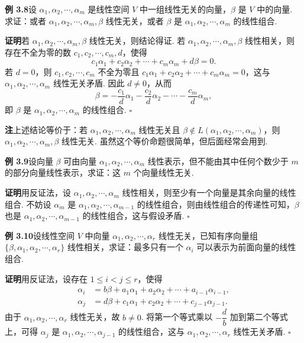 \documentclass[UTF8, 12pt, fontset=fandol, oneside]{ctexart}
\begin{document}
\noindent\textbf{例 3.8}\quad 设 $\alpha_1,\alpha_2,\cdots,\alpha_m$ 是线性空间 $V$ 中一组线性无关的向量，$\beta$ 是 $V$ 中的向量. 求证：或者 $\alpha_1,\alpha_2,\cdots,\alpha_m,\beta$ 线性无关，或者 $\beta$ 是 $\alpha_1,\alpha_2,\cdots,\alpha_m$ 的线性组合.

\noindent\textbf{证明}\quad 若 $\alpha_1,\alpha_2,\cdots,\alpha_m,\beta$ 线性无关，则结论得证. 若 $\alpha_1,\alpha_2,\cdots,\alpha_m,\beta$ 线性相关，则存在不全为零的数 $c_1,c_2,\cdots,c_m,d$，使得
\[
c_1\alpha_1+c_2\alpha_2+\cdots+c_m\alpha_m+d\beta=0.
\]
若 $d=0$，则 $c_1,c_2,\cdots,c_m$ 不全为零且 $c_1\alpha_1+c_2\alpha_2+\cdots+c_m\alpha_m=0$，这与 $\alpha_1,\alpha_2,\cdots,\alpha_m$ 线性无关矛盾. 因此 $d\ne 0$，从而
\[
\beta=-\frac{c_1}{d}\alpha_1-\frac{c_2}{d}\alpha_2-\cdots-\frac{c_m}{d}\alpha_m,
\]
即 $\beta$ 是 $\alpha_1,\alpha_2,\cdots,\alpha_m$ 的线性组合. $\square$

\noindent\textbf{注}\quad 上述结论等价于：若 $\alpha_1,\alpha_2,\cdots,\alpha_m$ 线性无关且 $\beta\notin L(\alpha_1,\alpha_2,\cdots,\alpha_m)$，则 $\alpha_1,\alpha_2,\cdots,\alpha_m,\beta$ 线性无关. 虽然这个等价命题很简单，但后面经常会用到.

\noindent\textbf{例 3.9}\quad 设向量 $\beta$ 可由向量 $\alpha_1,\alpha_2,\cdots,\alpha_m$ 线性表示，但不能由其中任何个数少于 $m$ 的部分向量线性表示，求证：这 $m$ 个向量线性无关.

\noindent\textbf{证明}\quad 用反证法，设 $\alpha_1,\alpha_2,\cdots,\alpha_m$ 线性相关，则至少有一个向量是其余向量的线性组合. 不妨设 $\alpha_m$ 是 $\alpha_1,\alpha_2,\cdots,\alpha_{m-1}$ 的线性组合，则由线性组合的传递性可知，$\beta$ 也是 $\alpha_1,\alpha_2,\cdots,\alpha_{m-1}$ 的线性组合，这与假设矛盾. $\square$

\noindent\textbf{例 3.10}\quad 设线性空间 $V$ 中向量 $\alpha_1,\alpha_2,\cdots,\alpha_r$ 线性无关，已知有序向量组 $\{\beta,\alpha_1,\alpha_2,\cdots,\alpha_r\}$ 线性相关，求证：最多只有一个 $\alpha_i$ 可以表示为前面向量的线性组合.

\noindent\textbf{证明}\quad 用反证法，设存在 $1\le i<j\le r$，使得
\[
\begin{aligned}
\alpha_i&=b\beta+a_1\alpha_1+a_2\alpha_2+\cdots+a_{i-1}\alpha_{i-1},\\
\alpha_j&=d\beta+c_1\alpha_1+c_2\alpha_2+\cdots+c_{j-1}\alpha_{j-1}.
\end{aligned}
\]
由于 $\alpha_1,\alpha_2,\cdots,\alpha_r$ 线性无关，故 $b\ne 0$. 将第一个等式乘以 $-\dfrac{d}{b}$ 加到第二个等式上，可得 $\alpha_j$ 是 $\alpha_1,\alpha_2,\cdots,\alpha_{j-1}$ 的线性组合，这与 $\alpha_1,\alpha_2,\cdots,\alpha_r$ 线性无关矛盾. $\square$
\end{document}
